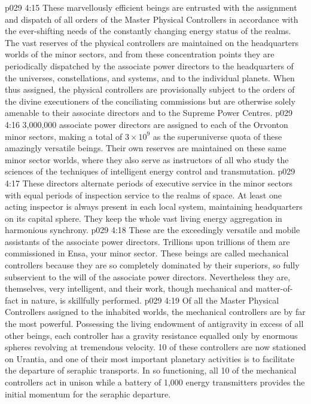 \vs p029 4:15 \bibnobreakspace {} These marvellously efficient beings are entrusted with the assignment and dispatch of all orders of the Master Physical Controllers in accordance with the ever\hyp{}shifting needs of the constantly changing energy status of the realms. The vast reserves of the physical controllers are maintained on the headquarters worlds of the minor sectors, and from these concentration points they are periodically dispatched by the associate power directors to the headquarters of the universes, constellations, and systems, and to the individual planets. When thus assigned, the physical controllers are provisionally subject to the orders of the divine executioners of the conciliating commissions but are otherwise solely amenable to their associate directors and to the Supreme Power Centres.
\vs p029 4:16 3,000,000 associate power directors are assigned to each of the Orvonton minor sectors, making a total of $3 \times 10^9$ as the superuniverse quota of these amazingly versatile beings. Their own reserves are maintained on these same minor sector worlds, where they also serve as instructors of all who study the sciences of the techniques of intelligent energy control and transmutation.
\vs p029 4:17 These directors alternate periods of executive service in the minor sectors with equal periods of inspection service to the realms of space. At least one acting inspector is always present in each local system, maintaining headquarters on its capital sphere. They keep the whole vast living energy aggregation in harmonious synchrony.
\vs p029 4:18 \bibnobreakspace {} These are the exceedingly versatile and mobile assistants of the associate power directors. Trillions upon trillions of them are commissioned in Ensa, your minor sector. These beings are called mechanical controllers because they are so completely dominated by their superiors, so fully subservient to the will of the associate power directors. Nevertheless they are, themselves, very intelligent, and their work, though mechanical and matter\hyp{}of\hyp{}fact in nature, is skillfully performed.
\vs p029 4:19 Of all the Master Physical Controllers assigned to the inhabited worlds, the mechanical controllers are by far the most powerful. Possessing the living endowment of antigravity in excess of all other beings, each controller has a gravity resistance equalled only by enormous spheres revolving at tremendous velocity. 10 of these controllers are now stationed on Urantia, and one of their most important planetary activities is to facilitate the departure of seraphic transports. In so functioning, all 10 of the mechanical controllers act in unison while a battery of 1,000 energy transmitters provides the initial momentum for the seraphic departure.
